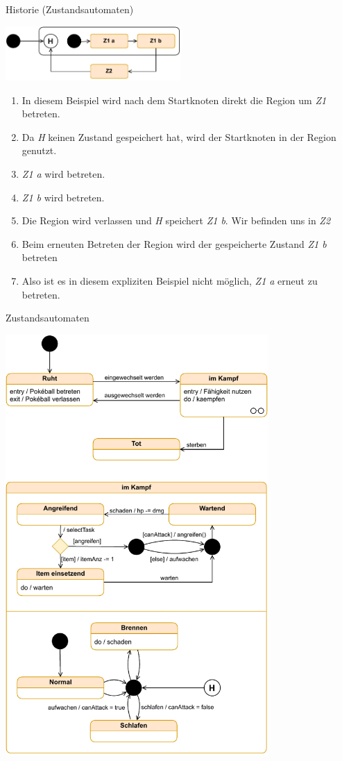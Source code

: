 \begin{example}{Historie (Zustandsautomaten)}
    \begin{center}
        \includegraphics[width=0.5\textwidth]{includes/figures/example_diagrams_state_history.pdf}
    \end{center}

    \begin{enumerate}
        \item In diesem Beispiel wird nach dem Startknoten direkt die Region um \emph{Z1} betreten.
        \item  Da \emph{H} keinen Zustand gespeichert hat, wird der Startknoten in der Region genutzt.
        \item \emph{Z1 a} wird betreten.
        \item \emph{Z1 b} wird betreten.
        \item Die Region wird verlassen und \emph{H} speichert \emph{Z1 b}.
              Wir befinden uns in \emph{Z2}
        \item Beim erneuten Betreten der Region wird der gespeicherte Zustand \emph{Z1 b} betreten
        \item Also ist es in diesem expliziten Beispiel nicht möglich, \emph{Z1 a} erneut zu betreten.
    \end{enumerate}
\end{example}

\begin{example}{Zustandsautomaten}
    \begin{center}
        \includegraphics[width=0.75\textwidth]{includes/figures/example_diagrams_state.pdf}
    \end{center}
\end{example}